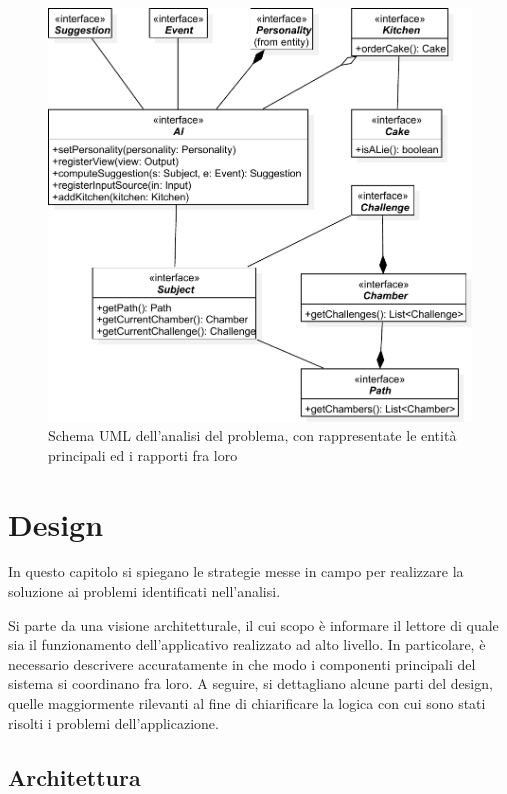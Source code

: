 \documentclass[a4paper,12pt]{report}
\begin{document}
\begin{figure}
\centering{}
\includegraphics{img/analysis}
\caption{Schema UML dell'analisi del problema, con rappresentate le entità principali ed i rapporti fra loro}
\label{img:analysis}
\end{figure}

\chapter{Design}

In questo capitolo si spiegano le strategie messe in campo per realizzare la soluzione ai problemi identificati nell'analisi.

Si parte da una visione architetturale, il cui scopo è informare il lettore di quale sia il funzionamento dell'applicativo realizzato ad alto livello.
%
In particolare, è necessario descrivere accuratamente in che modo i componenti principali del sistema si coordinano fra loro.
%
A seguire, si dettagliano alcune parti del design, quelle maggiormente rilevanti al fine di chiarificare la logica con cui sono stati risolti i problemi dell'applicazione.

\section{Architettura}
\end{document}
